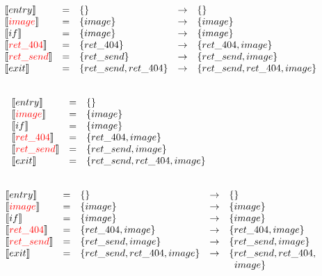 \begin{frame}
\[
\begin{array}{lclcl}
  \constraint{entry} & = & \{\} & \rightarrow & \{\}\\
  \assignconstraint{image} & = & \{image\} & \rightarrow &\{image\}\\
  \constraint{if} & = & \{image\} & \rightarrow &\{image\}\\
  \assignconstraint{ret\_404} & = & \{ret\_404\} & \rightarrow &\{ret\_404, image\}\\
  \assignconstraint{ret\_send} & = & \{ret\_send\} & \rightarrow &\{ret\_send, image\}\\
  \constraint{exit} & = & \{ret\_send, ret\_404\} & \rightarrow & \{ret\_send, ret\_404, image\}\\
  && \phantom{\{command, param\}} && \phantom{\{command, param\}}
\end{array}
\]
\end{frame}

\begin{frame}
\[
\begin{array}{lclcl}
  \constraint{entry} & = & \{\} &&\\
  \assignconstraint{image} & = & \{image\} &&\\
  \constraint{if} & = & \{image\} &&\\
  \assignconstraint{ret\_404} & = & \{ret\_404, image\} &&\\
  \assignconstraint{ret\_send} & = & \{ret\_send, image\} &&\\
  \constraint{exit} & = & \{ret\_send, ret\_404, image\} &&\\
  && \phantom{\{command, param\}} && \phantom{\{command, param\}}
\end{array}
\]
\end{frame}

\begin{frame}
\[
\begin{array}{lclcl}
  \llbracket entry \rrbracket & = & \{\} & \rightarrow & \{\}\\
  \llbracket {\color{red}image} \rrbracket & = & \{image\} & \rightarrow &\{image\}\\
  \llbracket if \rrbracket & = & \{image\} & \rightarrow &\{image\}\\
  \llbracket {\color{red}ret\_404} \rrbracket & = & \{ret\_404, image\} & \rightarrow &\{ret\_404, image\}\\
  \llbracket {\color{red}ret\_send} \rrbracket & = & \{ret\_send, image\} & \rightarrow &\{ret\_send, image\}\\
  \llbracket exit \rrbracket & = & \{ret\_send, ret\_404, image\} & \rightarrow & \{ret\_send, ret\_404,\\
&&&& \phantom{a}image\}
\end{array}
\]
\end{frame}

